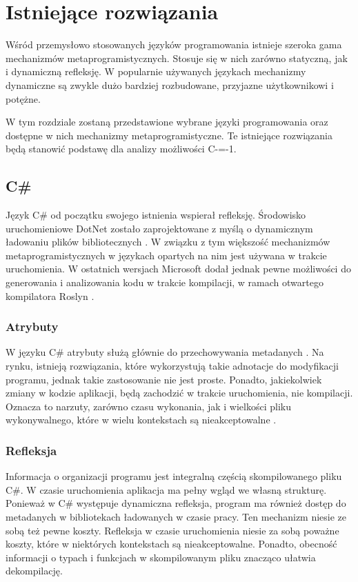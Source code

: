 \section{Istniejące rozwiązania}

Wśród przemysłowo stosowanych języków programowania istnieje szeroka gama mechanizmów metaprogramistycznych. Stosuje się w nich zarówno statyczną, jak i dynamiczną refleksję. W popularnie używanych językach mechanizmy dynamiczne są zwykle dużo bardziej rozbudowane, przyjazne użytkownikowi i potężne.

W tym rozdziale zostaną przedstawione wybrane języki programowania oraz dostępne w nich mechanizmy metaprogramistyczne.
Te istniejące rozwiązania będą stanowić podstawę dla analizy możliwości C-=-1.



\subsection{C\#}
Język C\# od początku swojego istnienia wspierał refleksję\cite{csharp:getType}.
Środowisko uruchomieniowe DotNet zostało zaprojektowane z myślą o dynamicznym ładowaniu plików bibliotecznych \cite{csharp:assemblies}.
W związku z tym większość mechanizmów metaprogramistycznych w językach opartych na nim jest używana w trakcie uruchomienia.
W ostatnich wersjach Microsoft dodał jednak pewne możliwości do generowania i analizowania kodu w trakcie kompilacji, w ramach otwartego kompilatora Roslyn \cite{csharp:source_generators}.

\subsubsection{Atrybuty}
W języku C\# atrybuty służą głównie do przechowywania metadanych \cite{csharp:attributes}.
Na rynku, istnieją rozwiązania, które wykorzystują takie adnotacje do modyfikacji programu, jednak takie zastosowanie nie jest proste.
Ponadto, jakiekolwiek zmiany w kodzie aplikacji, będą zachodzić w trakcie uruchomienia, nie kompilacji.
Oznacza to narzuty, zarówno czasu wykonania, jak i wielkości pliku wykonywalnego, które w wielu kontekstach są nieakceptowalne \cite{csharp:reflection_cost, cpp:reflection:high_performance}.
\subsubsection{Refleksja}

Informacja o organizacji programu jest integralną częścią skompilowanego pliku C\#.
W czasie uruchomienia aplikacja ma pełny wgląd we własną strukturę.
Ponieważ w C\# występuje dynamiczna refleksja, program ma również dostęp do metadanych w bibliotekach ładowanych w czasie pracy.
Ten mechanizm niesie ze sobą też pewne koszty.
Refleksja w czasie uruchomienia niesie za sobą poważne koszty, które w niektórych kontekstach są nieakceptowalne.
Ponadto, obecność informacji o typach i funkcjach w skompilowanym pliku znacząco ułatwia dekompilację.

